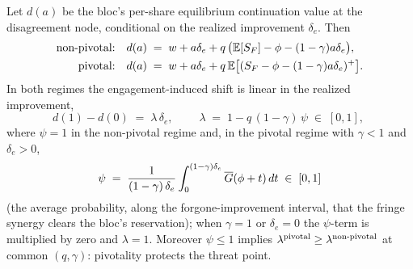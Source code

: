 \begin{proposition}
\label{prop:d7-lambda}
Let $d(a)$ be the bloc's per-share equilibrium continuation value at the disagreement node, conditional on the realized improvement $\delta_{e}$. Then
\begin{align}
\text{non-pivotal:}\quad d(a)&\;=\;w+a\delta_{e}+q\,\bigl(\mathbb{E}[S_{F}]-\phi-(1-\gamma)a\delta_{e}\bigr),
\label{eq:d7-dNP}\\
\text{pivotal:}\quad d(a)&\;=\;w+a\delta_{e}+q\,\mathbb{E}\bigl[(S_{F}-\phi-(1-\gamma)a\delta_{e})^{+}\bigr].
\label{eq:d7-dP}
\end{align}
In both regimes the engagement-induced shift is linear in the realized improvement,
\[
d(1)-d(0)\;=\;\lambda\,\delta_{e},
\qquad
\boxed{\;\lambda\;=\;1-q\,(1-\gamma)\,\psi\;\in\;[0,1],\;}
\]
where $\psi=1$ in the non-pivotal regime and, in the pivotal regime with $\gamma<1$ and $\delta_{e}>0$,
\[
\psi\;=\;\frac{1}{(1-\gamma)\,\delta_{e}}\int_{0}^{(1-\gamma)\delta_{e}}\overline{G}(\phi+t)\,dt\;\in\;[0,1]
\]
(the average probability, along the forgone-improvement interval, that the fringe synergy clears the bloc's reservation); when $\gamma=1$ or $\delta_{e}=0$ the $\psi$-term is multiplied by zero and $\lambda=1$. Moreover $\psi\le 1$ implies $\lambda^{\textup{pivotal}}\ge\lambda^{\textup{non-pivotal}}$ at common $(q,\gamma)$: pivotality protects the threat point.
\end{proposition}


